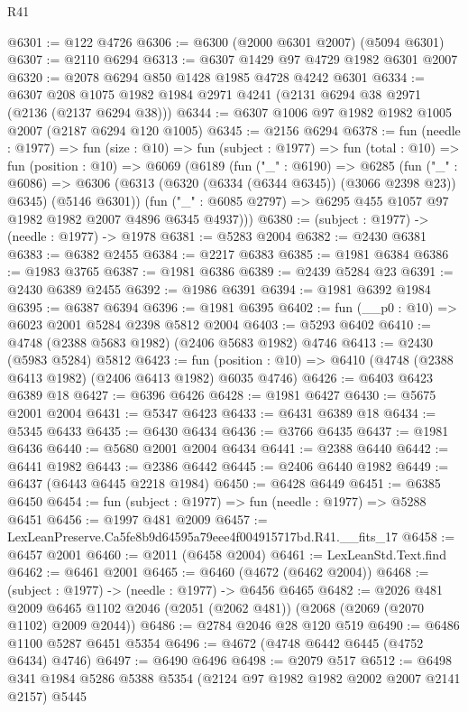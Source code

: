 \begin{lexlean}{R41}
\begin{coremodule}
@6301 := @122 @4726
@6306 := @6300 (@2000 @6301 @2007) (@5094 @6301)
@6307 := @2110 @6294
@6313 := @6307 @1429 @97 @4729 @1982 @6301 @2007
@6320 := @2078 @6294 @850 @1428 @1985 @4728 @4242 @6301
@6334 := @6307 @208 @1075 @1982 @1984 @2971 @4241 (@2131 @6294 @38 @2971 (@2136 (@2137 @6294 @38)))
@6344 := @6307 @1006 @97 @1982 @1982 @1005 @2007 (@2187 @6294 @120 @1005)
@6345 := @2156 @6294
@6378 := fun (needle : @1977) =>
  fun (size : @10) =>
  fun (subject : @1977) =>
  fun (total : @10) =>
  fun (position : @10) =>
  @6069
    (@6189
      (fun ("_" : @6190) =>
      @6285
        (fun ("_" : @6086) =>
        @6306 (@6313 (@6320 (@6334 (@6344 @6345)) (@3066 @2398 @23)) @6345) (@5146 @6301))
        (fun ("_" : @6085 @2797) => @6295 @455 @1057 @97 @1982 @1982 @2007 @4896 @6345 @4937)))
@6380 := (subject : @1977) -> (needle : @1977) -> @1978
@6381 := @5283 @2004
@6382 := @2430 @6381
@6383 := @6382 @2455
@6384 := @2217 @6383
@6385 := @1981 @6384
@6386 := @1983 @3765
@6387 := @1981 @6386
@6389 := @2439 @5284 @23
@6391 := @2430 @6389 @2455
@6392 := @1986 @6391
@6394 := @1981 @6392 @1984
@6395 := @6387 @6394
@6396 := @1981 @6395
@6402 := fun (__p0 : @10) => @6023 @2001 @5284 @2398 @5812 @2004
@6403 := @5293 @6402
@6410 := @4748 (@2388 @5683 @1982) (@2406 @5683 @1982) @4746
@6413 := @2430 (@5983 @5284) @5812
@6423 := fun (position : @10) => @6410 (@4748 (@2388 @6413 @1982) (@2406 @6413 @1982) @6035 @4746)
@6426 := @6403 @6423 @6389 @18
@6427 := @6396 @6426
@6428 := @1981 @6427
@6430 := @5675 @2001 @2004
@6431 := @5347 @6423
@6433 := @6431 @6389 @18
@6434 := @5345 @6433
@6435 := @6430 @6434
@6436 := @3766 @6435
@6437 := @1981 @6436
@6440 := @5680 @2001 @2004 @6434
@6441 := @2388 @6440
@6442 := @6441 @1982
@6443 := @2386 @6442
@6445 := @2406 @6440 @1982
@6449 := @6437 (@6443 @6445 @2218 @1984)
@6450 := @6428 @6449
@6451 := @6385 @6450
@6454 := fun (subject : @1977) => fun (needle : @1977) => @5288 @6451
@6456 := @1997 @481 @2009
@6457 := LexLeanPreserve.Ca5fe8b9d64595a79eee4f004915717bd.R41.__fits_17
@6458 := @6457 @2001
@6460 := @2011 (@6458 @2004)
@6461 := LexLeanStd.Text.find
@6462 := @6461 @2001
@6465 := @6460 (@4672 (@6462 @2004))
@6468 := (subject : @1977) -> (needle : @1977) -> @6456 @6465
@6482 := @2026
    @481
    @2009
    @6465
    @1102
    @2046
    (@2051 (@2062 @481))
    (@2068 (@2069 (@2070 @1102) @2009 @2044))
@6486 := @2784 @2046 @28 @120 @519
@6490 := @6486 @1100 @5287 @6451 @5354
@6496 := @4672 (@4748 @6442 @6445 (@4752 @6434) @4746)
@6497 := @6490 @6496
@6498 := @2079 @517
@6512 := @6498 @341 @1984 @5286 @5388 @5354 (@2124 @97 @1982 @1982 @2002 @2007 @2141 @2157) @5445

\end{coremodule}
\end{lexlean}
